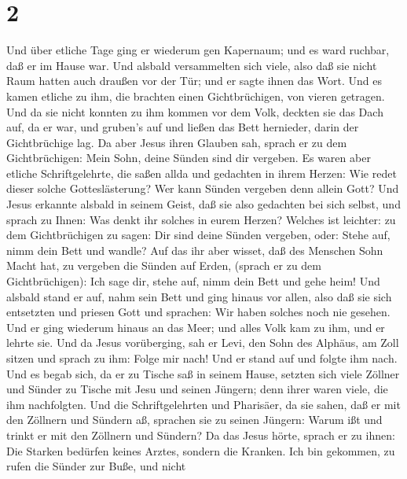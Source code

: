 \hypertarget{section-1}{%
\section{2}\label{section-1}}

 Und über etliche Tage ging er wiederum gen Kapernaum; und
es ward ruchbar, daß er im Hause war.  Und alsbald
versammelten sich viele, also daß sie nicht Raum hatten auch draußen vor
der Tür; und er sagte ihnen das Wort.  Und es kamen etliche
zu ihm, die brachten einen Gichtbrüchigen, von vieren getragen.
 Und da sie nicht konnten zu ihm kommen vor dem Volk,
deckten sie das Dach auf, da er war, und gruben's auf und ließen das
Bett hernieder, darin der Gichtbrüchige lag.  Da aber Jesus
ihren Glauben sah, sprach er zu dem Gichtbrüchigen: Mein Sohn, deine
Sünden sind dir vergeben.  Es waren aber etliche
Schriftgelehrte, die saßen allda und gedachten in ihrem Herzen:
 Wie redet dieser solche Gotteslästerung? Wer kann Sünden
vergeben denn allein Gott?  Und Jesus erkannte alsbald in
seinem Geist, daß sie also gedachten bei sich selbst, und sprach zu
Ihnen: Was denkt ihr solches in eurem Herzen?  Welches ist
leichter: zu dem Gichtbrüchigen zu sagen: Dir sind deine Sünden
vergeben, oder: Stehe auf, nimm dein Bett und wandle?  Auf
das ihr aber wisset, daß des Menschen Sohn Macht hat, zu vergeben die
Sünden auf Erden, (sprach er zu dem Gichtbrüchigen):  Ich
sage dir, stehe auf, nimm dein Bett und gehe heim!  Und
alsbald stand er auf, nahm sein Bett und ging hinaus vor allen, also daß
sie sich entsetzten und priesen Gott und sprachen: Wir haben solches
noch nie gesehen.  Und er ging wiederum hinaus an das Meer;
und alles Volk kam zu ihm, und er lehrte sie.  Und da Jesus
vorüberging, sah er Levi, den Sohn des Alphäus, am Zoll sitzen und
sprach zu ihm: Folge mir nach! Und er stand auf und folgte ihm nach.
 Und es begab sich, da er zu Tische saß in seinem Hause,
setzten sich viele Zöllner und Sünder zu Tische mit Jesu und seinen
Jüngern; denn ihrer waren viele, die ihm nachfolgten.  Und
die Schriftgelehrten und Pharisäer, da sie sahen, daß er mit den
Zöllnern und Sündern aß, sprachen sie zu seinen Jüngern: Warum ißt und
trinkt er mit den Zöllnern und Sündern?  Da das Jesus
hörte, sprach er zu ihnen: Die Starken bedürfen keines Arztes, sondern
die Kranken. Ich bin gekommen, zu rufen die Sünder zur Buße, und nicht
